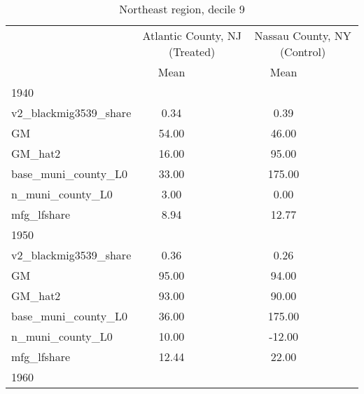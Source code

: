 \begin{table}[htbp]\centering
\def\sym#1{\ifmmode^{#1}\else\(^{#1}\)\fi}
\caption{Northeast region, decile 9 \label{tab1}}
\begin{tabular}{l*{2}{ccc}}
\toprule
                    &\multicolumn{3}{c}{Atlantic County, NJ (Treated)}&\multicolumn{3}{c}{Nassau County, NY (Control)}\\
                    &        Mean&            &            &        Mean&            &            \\
\midrule
1940                &            &            &            &            &            &            \\
v2\_blackmig3539\_share&        0.34&            &            &        0.39&            &            \\
GM                  &       54.00&            &            &       46.00&            &            \\
GM\_hat2             &       16.00&            &            &       95.00&            &            \\
base\_muni\_county\_L0 &       33.00&            &            &      175.00&            &            \\
n\_muni\_county\_L0    &        3.00&            &            &        0.00&            &            \\
mfg\_lfshare         &        8.94&            &            &       12.77&            &            \\
\midrule
1950                &            &            &            &            &            &            \\
v2\_blackmig3539\_share&        0.36&            &            &        0.26&            &            \\
GM                  &       95.00&            &            &       94.00&            &            \\
GM\_hat2             &       93.00&            &            &       90.00&            &            \\
base\_muni\_county\_L0 &       36.00&            &            &      175.00&            &            \\
n\_muni\_county\_L0    &       10.00&            &            &      -12.00&            &            \\
mfg\_lfshare         &       12.44&            &            &       22.00&            &            \\
\midrule
1960                &            &            &            &            &            &            \\

\end{tabular}
\end{table}
